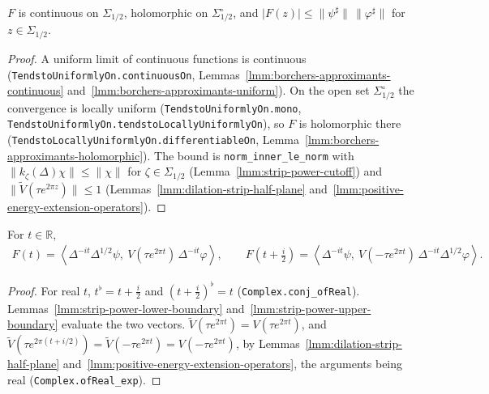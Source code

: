 \begin{lemma}
    \label{lmm:borchers-function-analytic}
    \leanok
    $F$ is continuous on $\Sigma_{1/2}$, holomorphic on $\Sigma^\circ_{1/2}$, and $|F(z)| \le \|\psi^\sharp\|\,\|\varphi^\sharp\|$ for $z \in \Sigma_{1/2}$.
\end{lemma}
\begin{proof}
    \leanok
    A uniform limit of continuous functions is continuous (\texttt{TendstoUniformlyOn.continuousOn}, Lemmas~\ref{lmm:borchers-approximants-continuous} and~\ref{lmm:borchers-approximants-uniform}). On the open set $\Sigma^\circ_{1/2}$ the convergence is locally uniform (\texttt{TendstoUniformlyOn.mono}, \texttt{TendstoUniformlyOn.tendstoLocallyUniformlyOn}), so $F$ is holomorphic there (\texttt{TendstoLocallyUniformlyOn.differentiableOn}, Lemma~\ref{lmm:borchers-approximants-holomorphic}). The bound is \texttt{norm\_inner\_le\_norm} with $\|k_\zeta(\Delta)\chi\| \le \|\chi\|$ for $\zeta \in \Sigma_{1/2}$ (Lemma~\ref{lmm:strip-power-cutoff}) and $\|\widetilde{V}(\tau e^{2\pi z})\| \le 1$ (Lemmas~\ref{lmm:dilation-strip-half-plane} and~\ref{lmm:positive-energy-extension-operators}).
\end{proof}

\begin{lemma}
    \label{lmm:borchers-function-boundary}
    \leanok
    For $t \in \mathbb{R}$,
    \begin{align}
        F(t) = \left< \Delta^{-it}\Delta^{1/2}\psi, \ V(\tau e^{2\pi t})\,\Delta^{-it}\varphi \right>, \qquad F(t + \tfrac{i}{2}) = \left< \Delta^{-it}\psi, \ V(-\tau e^{2\pi t})\,\Delta^{-it}\Delta^{1/2}\varphi \right>.
    \end{align}
\end{lemma}
\begin{proof}
    \leanok
    For real $t$, $t^\flat = t + \tfrac{i}{2}$ and $(t + \tfrac{i}{2})^\flat = t$ (\texttt{Complex.conj\_ofReal}). Lemmas~\ref{lmm:strip-power-lower-boundary} and~\ref{lmm:strip-power-upper-boundary} evaluate the two vectors. $\widetilde{V}(\tau e^{2\pi t}) = V(\tau e^{2\pi t})$, and $\widetilde{V}(\tau e^{2\pi(t + i/2)}) = \widetilde{V}(-\tau e^{2\pi t}) = V(-\tau e^{2\pi t})$, by Lemmas~\ref{lmm:dilation-strip-half-plane} and~\ref{lmm:positive-energy-extension-operators}, the arguments being real (\texttt{Complex.ofReal\_exp}).
\end{proof}

